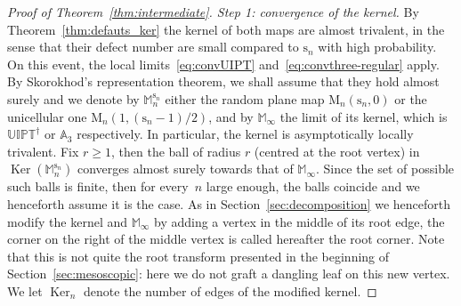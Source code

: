 \documentclass[JEP,XML,SOM,Unicode,NoFloatCountersInSection,NoEqCountersInSection]{cedram}
\theoremstyle{plain}
\theoremstyle{definition}
\theoremstyle{remark}
\newcommand{\Map}{\mathrm{M}}
\newcommand{\Mapb}{\mathbb{M}}
\newcommand{\spar}{\mathrm{s}}
\DeclareMathOperator{\Ker}{Ker}
\begin{document}
\begin{proof}[Proof of Theorem~\ref{thm:intermediate}. Step 1: convergence of the kernel]
By Theorem~\ref{thm:defauts_ker} the kernel of both maps are almost trivalent, in the sense that their defect number are small compared to $\spar_n$ with high probability. On this event, the local limits~\eqref{eq:convUIPT} and~\eqref{eq:convthree-regular} apply. By \eg Skorokhod's representation theorem, we shall assume that they hold almost surely and we denote by $\Mapb_n^{\spar_n}$ either the random plane map $\Map_{n}(\spar_{n},0)$ or the unicellular one $\Map_{n}(1, (\spar_{n}-1)/2)$, and by $\Mapb_\infty$ the limit of its kernel, which is $\mathbb{UIPT}^\dagger$ or $\mathbb{A}_3$ respectively. In particular, the kernel is asymptotically locally trivalent.
Fix $r \ge1$, then the ball of radius $r$ (centred at the root vertex) in $\Ker(\Mapb_n^{\spar_n})$ converges almost surely towards that of $\Mapb_\infty$. Since the set of possible such balls is finite, then for \hbox{every}~$n$ large enough, the balls coincide and we henceforth assume it is the case. As in Section~\ref{sec:decomposition} we henceforth modify the kernel and $\Mapb_\infty$ by adding a vertex in the middle of its root edge, the corner on the right of the middle vertex is called hereafter the root corner. Note that this is not quite the root transform presented in the beginning of Section~\ref{sec:mesoscopic}: here we do not graft a dangling leaf on this new vertex.
We let $\Ker_n$ denote the number of edges of the modified kernel.


\end{proof}
\end{document}
